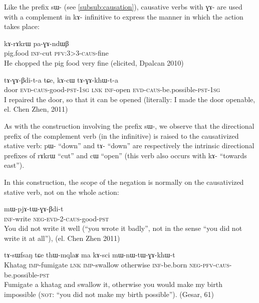 \documentclass[oldfontcommands,oneside,a4paper,11pt]{article}
\newcommand{\ipa}[1]{{\phon \mbox{#1}}} %
\newcommand{\sg}{\textsc{sg}}
\newcommand{\pfv}{\textsc{pfv}}
\newcommand{\caus}{\textsc{caus}}
\newcommand{\lnk}{\textsc{lnk}}
\newcommand{\evd}{\textsc{evd}}
\newcommand{\imp}{\textsc{imp}}
\newcommand{\inftv}{\textsc{inf}}
\newcommand{\negat}{\textsc{neg}}
\newcommand{\pst}{\textsc{pst}}
\begin{document}
 
Like the prefix \ipa{sɯ-} (see \ref{subsub:causation}), causative verbs with \ipa{ɣɤ-} are used with a complement in \ipa{kɤ-} infinitive to express the manner in which the action takes place:

\begin{exe}
\ex 
\gll \ipa{paʁndza}  	\ipa{kɤ-rɤkrɯ}  	\ipa{pa-ɣɤ-ndɯβ}  \\
pig.food \inftv{}-cut \pfv{}:3>3-\caus{}-fine \\
 \glt  He chopped the pig food very fine (elicited, Dpalcan 2010)
   \end{exe}
   
 \begin{exe}
\ex 
\gll \ipa{kɯm}  	\ipa{tɤ-ɣɤ-βdi-t-a}  	\ipa{tɕe,}  	\ipa{kɤ-cɯ}  	\ipa{tɤ-ɣɤ-khɯ-t-a}  	  \\
door \evd{}-\caus{}-good-\pst{}-1\sg{} \lnk{} \inftv{}-open \evd{}-\caus{}-be.possible-\pst{}-1\sg{} \\
 \glt   I repaired the door, so that it can be opened (literally: I made the door openable, el. Chen Zhen, 2011)
   \end{exe}

    
As with the construction involving the prefix \ipa{sɯ-}, we observe that the directional prefix of the complement verb (in the infinitive) is raised to the causativized stative verb: \ipa{pɯ-} ``down'' and  \ipa{tɤ-} ``down'' are respectively the intrinsic directional prefixes of \ipa{rɤkrɯ} ``cut'' and  \ipa{cɯ} ``open'' (this verb also occurs with \ipa{kɤ-} ``towards east''). 
 
In this construction, the scope of the negation is normally on the causativized stative verb, not on the whole action:
  \begin{exe}
\ex 
 \gll \ipa{kɤ-rɤt} \ipa{mɯ-pjɤ-tɯ-ɣɤ-βdi-t} \\
\inftv{}-write \negat{}-\evd{}-2-\caus{}-good-\pst{} \\
 \glt    You did not write it well (``you wrote it badly'', not in the sense ``you did not write it at all''), (el. Chen Zhen 2011)
   \end{exe}  
   \begin{exe}
\ex 
 \gll  	 \ipa{khɤdaʁ}  	\ipa{tɤ-sɯfsaŋ}  	\ipa{tɕe}  	\ipa{thɯ-mqlaʁ}  	\ipa{ma}  	\ipa{kɤ-sci}  	\ipa{mɯ-nɯ-tɯ-ɣɤ-khɯ-t}  \\
Khatag \imp{}-fumigate \lnk{} \imp{}-swallow otherwise \inftv{}-be.born \negat{}-\pfv{}-\caus{}-be.possible-\pst{} \\
 \glt   Fumigate a \ipa{khatag} and swallow it, otherwise you would make my birth impossible (\textsc{not}: ``you did not make my birth possible''). (Gesar, 61)
   \end{exe}  
   
\end{document}
